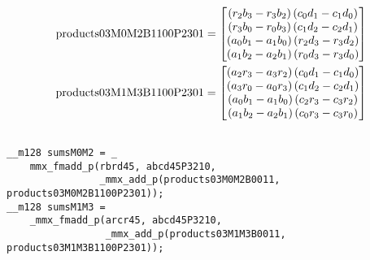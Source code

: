 \begin{align*}
\mathrm{products03M0M2B1100P2301} 
=
\begin{bmatrix}
\left(r_2b_3 - r_3b_2\right)\left(c_0d_1 - c_1d_0\right)\\
\left(r_3b_0 - r_0b_3\right)\left(c_1d_2 - c_2d_1\right)\\
\left(a_0b_1 - a_1b_0\right)\left(r_2d_3 - r_3d_2\right)\\
\left(a_1b_2 - a_2b_1\right)\left(r_0d_3 - r_3d_0\right)\\
\end{bmatrix}
\\
\mathrm{products03M1M3B1100P2301} 
=
\begin{bmatrix}
\left(a_2r_3 - a_3r_2\right)\left(c_0d_1 - c_1d_0\right)\\
\left(a_3r_0 - a_0r_3\right)\left(c_1d_2 - c_2d_1\right)\\
\left(a_0b_1 - a_1b_0\right)\left(c_2r_3 - c_3r_2\right)\\
\left(a_1b_2 - a_2b_1\right)\left(c_0r_3 - c_3r_0\right)\\
\end{bmatrix}
\end{align*}

\begin{verbatim}

__m128 sumsM0M2 = _
    mmx_fmadd_p(rbrd45, abcd45P3210, 
                _mmx_add_p(products03M0M2B0011, products03M0M2B1100P2301));
__m128 sumsM1M3 = 
    _mmx_fmadd_p(arcr45, abcd45P3210, 
                 _mmx_add_p(products03M1M3B0011, products03M1M3B1100P2301));    
\end{verbatim}

